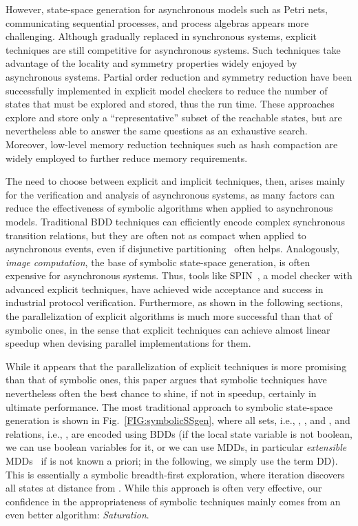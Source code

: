 \documentclass[copyright,creativecommons]{eptcs}
\begin{document}
However, state-space generation for asynchronous models
such as Petri nets, communicating sequential processes, and
process algebras appears more challenging.
Although gradually replaced in synchronous systems,
explicit techniques are still competitive for asynchronous systems.
Such techniques take advantage of the locality and symmetry
properties widely enjoyed by asynchronous systems.
Partial order reduction \cite{Godefroid1996,Valmari1991CAV}
and symmetry reduction \cite{Chiola1991b}
have been successfully implemented
in explicit model checkers to reduce the number of states that must
be explored and stored, thus the run time.
These approaches explore
and store only a ``representative'' subset of the reachable states,
but are nevertheless able to answer the same questions as an
exhaustive search. Moreover, low-level memory reduction techniques
such as hash compaction are widely employed to further reduce memory
requirements.

The need to choose between explicit and implicit techniques, then, arises
mainly for the
verification and analysis of asynchronous systems, as many factors can reduce
the effectiveness of symbolic algorithms when applied to asynchronous models.
Traditional BDD techniques can efficiently encode complex synchronous transition
relations, but they are often not as compact when applied to asynchronous
events, even if disjunctive partitioning~\cite{Burch1991partitioned}
often helps.
Analogously, \emph{image computation}, the base of symbolic state-space
generation, is often expensive for asynchronous systems.
Thus, tools like SPIN~\cite{Holzmann2003spin}, a model checker
with advanced explicit techniques, have achieved wide acceptance and
success in industrial protocol verification.
Furthermore, as shown in the following sections, the parallelization
of explicit algorithms is much more successful than that of symbolic
ones, in the sense that explicit techniques can achieve almost linear
speedup when devising parallel implementations for them.

While it appears that the parallelization of explicit techniques is
more promising than that of symbolic ones, this paper argues that
symbolic techniques have nevertheless often the best chance to
shine, if not in speedup, certainly in ultimate performance.
The most traditional approach to symbolic state-space generation is
shown in Fig.~\ref{FIG:symbolicSSgen}, where all sets, i.e.,
, , and , and relations, i.e., , are
encoded using BDDs (if the local state variable  is not
boolean, we can use  boolean variables for
it, or we can use MDDs, in particular \emph{extensible}
MDDs~\cite{2009SOFSEM-extensible} if  is not known a priori; in
the following, we simply use the term DD).
This is essentially a
symbolic breadth-first exploration, where iteration  discovers
all states at distance  from . While this approach
is often very effective, our confidence in the appropriateness of
symbolic techniques mainly comes from an even better algorithm:
\emph{Saturation}.
\end{document}
